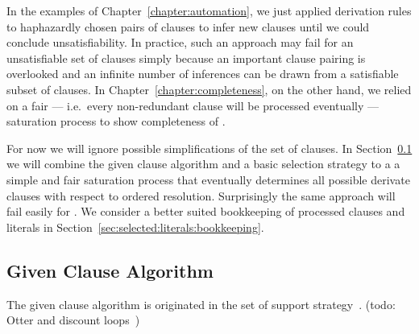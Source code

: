 In the examples of Chapter~\ref{chapter:automation},
we just applied derivation rules
to haphazardly chosen pairs of clauses
to infer new clauses
until we could conclude unsatisfiability.
%
In practice, such an approach may fail for an unsatisfiable set of clauses
simply because an important clause pairing is overlooked
and an infinite number of inferences can be drawn
from a satisfiable subset of clauses.
%
In Chapter~\ref{chapter:completeness}, on the other hand,
we relied on a fair ---
i.e.\ every non-redundant clause will be processed eventually ---
saturation process to show completeness of \InstGenEQ{}.

For now we will ignore possible simplifications of the set of clauses.
In Section~\ref{sec:given:clause:algorithm}
we will combine the given clause algorithm
and a basic selection strategy to a a simple and fair saturation process
that eventually determines all possible derivate clauses
with respect to ordered resolution.
Surprisingly the same approach will fail easily for \InstGen{}.
We consider a better suited bookkeeping of processed clauses and literals
in Section~\ref{sec:selected:literals:bookkeeping}.



\subsection{Given Clause Algorithm}\label{sec:given:clause:algorithm}

The given clause algorithm is originated in the set of support strategy~\cite{Wos:1965:ECS:321296.321302}. (todo: Otter and discount loops~\cite{DBLP:conf/cade/SchulzM16})

